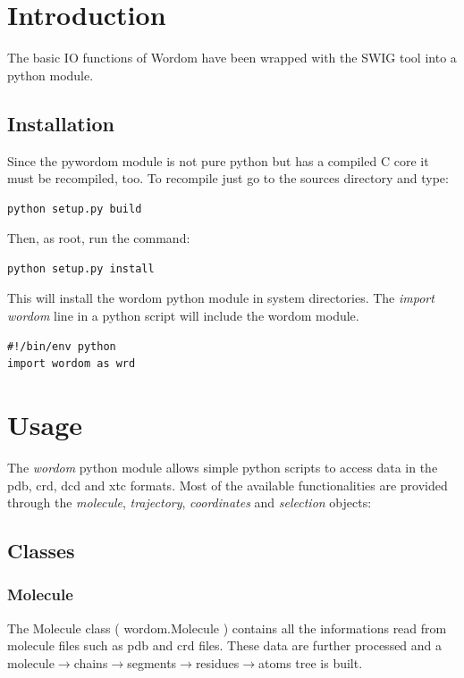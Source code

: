 \documentclass[11pt,twoside,onecolumn,a4paper,openright,notitlepage]{book}[2001/04/21]
\begin{document}
\tableofcontents
\clearpage





\chapter{Introduction}
The basic IO functions of Wordom have been wrapped with the SWIG\cite{Beazley:SWIG} tool into a python\cite{python} module.\\
\section{Installation}
Since the pywordom module is not pure python but has a compiled C core it must be recompiled, too. To recompile just go to the sources directory and type:
\begin{verbatim}
python setup.py build
\end{verbatim}
Then, as root, run the command:
\begin{verbatim}
python setup.py install
\end{verbatim}
This will install the wordom python module in system directories. The {\em import wordom} line in a python script will include the wordom module.
\begin{verbatim}
#!/bin/env python
import wordom as wrd
\end{verbatim}


\chapter{Usage}
The {\em wordom} python module allows simple python scripts to access data in the pdb, crd, dcd and xtc formats. Most of the available functionalities are provided through the {\em molecule}, {\em trajectory}, {\em coordinates} and {\em selection} objects:

\section{Classes}

\subsection{Molecule}
The Molecule class ( wordom.Molecule ) contains all the informations read from molecule files such as pdb and crd files. These data are further processed and a molecule$\rightarrow{}$chains$\rightarrow{}$segments$\rightarrow{}$residues$\rightarrow{}$atoms tree is built.
\end{document}
